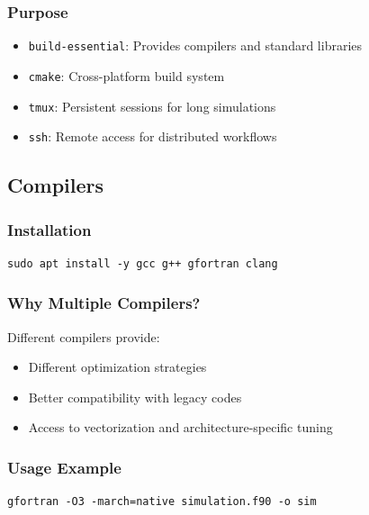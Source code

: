 \subsubsection{Purpose}

\begin{itemize}
    \item \texttt{build-essential}: Provides compilers and standard libraries
    \item \texttt{cmake}: Cross-platform build system
    \item \texttt{tmux}: Persistent sessions for long simulations
    \item \texttt{ssh}: Remote access for distributed workflows
\end{itemize}

\subsection{Compilers}

\subsubsection{Installation}

\begin{lstlisting}
sudo apt install -y gcc g++ gfortran clang
\end{lstlisting}

\subsubsection{Why Multiple Compilers?}

Different compilers provide:

\begin{itemize}
    \item Different optimization strategies
    \item Better compatibility with legacy codes
    \item Access to vectorization and architecture-specific tuning
\end{itemize}

\subsubsection{Usage Example}

\begin{lstlisting}
gfortran -O3 -march=native simulation.f90 -o sim
\end{lstlisting}


